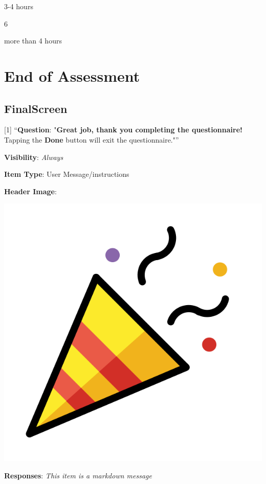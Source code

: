 \documentclass[]{book}
\begin{document}
3-4 hours

6

more than 4 hours

\hypertarget{end_section}{%
\chapter{End of Assessment}\label{end_section}}

\hypertarget{finalscreen}{%
\section{FinalScreen}\label{finalscreen}}

{[}1{]} ``\textbf{Question}: "\textbf{Great job, thank you completing the questionnaire!} Tapping the \textbf{Done} button will exit the questionnaire."''

\textbf{Visibility}: \emph{Always}

\textbf{Item Type}: User Message/instructions

\textbf{Header Image}:

\begin{flushleft}\includegraphics[width=0.33\linewidth]{downloadFigs4latex_NIMH_Applet_Codebook/FinalScreen_headerImg} \end{flushleft}

\textbf{Responses}: \emph{This item is a markdown message}


\end{document}
